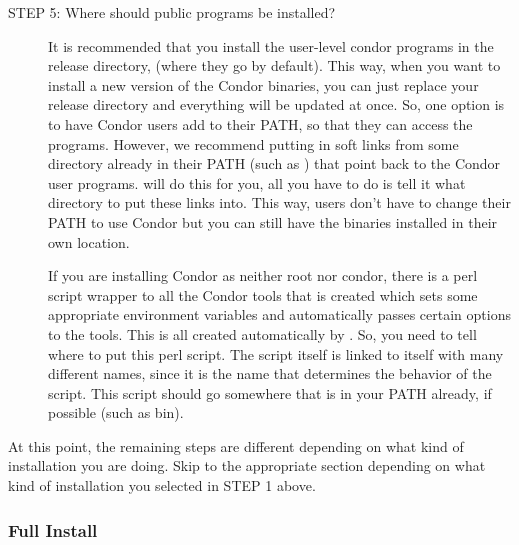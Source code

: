 \begin{description}
\item[STEP 5: Where should public programs be installed?]

     It is recommended that you install the user-level condor programs
     in the release directory, (where they go by default).  This way,
     when you want to install a new version of the Condor binaries,
     you can just replace your release directory and everything will
     be updated at once.  So, one option is to have Condor users add
      to their PATH, so that they can access the
     programs.  However, we recommend putting in soft links from some
     directory already in their PATH (such as ) that
     point back to the Condor user programs.   will do
     this for you, all you have to do is tell it what directory to put
     these links into.  This way, users don't have to change their
     PATH to use Condor but you can still have the binaries installed
     in their own location.

     If you are installing Condor as neither root nor condor, there is
     a perl script wrapper to all the Condor tools that is created
     which sets some appropriate environment variables and
     automatically passes certain options to the tools.  This is all
     created automatically by .  So, you need to tell
      where to put this perl script.  The script itself
     is linked to itself with many different names, since it is the
     name that determines the behavior of the script.  This script
     should go somewhere that is in your PATH already, if possible
     (such as \Tilde bin).

\end{description}

At this point, the remaining steps are different depending on what
kind of installation you are doing.  Skip to the appropriate section
depending on what kind of installation you selected in STEP 1 above.

\subsubsection{Full Install}

